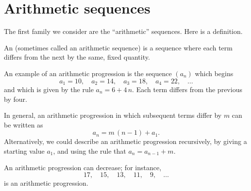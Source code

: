 \documentclass{ximera}
\begin{document}
\begin{question}
    \begin{multipleChoice}
    \end{multipleChoice}

\end{question}


\section{Arithmetic sequences}


The first family we consider are the ``arithmetic'' sequences.  Here
is a definition.



\begin{definition}
  An  (sometimes called an arithmetic
  sequence) is a sequence where each
  term differs from the next by the same, fixed quantity.
\end{definition}

\begin{example}
  An example of an arithmetic progression is the sequence $(a_n)$ which begins 
  $$
  a_1 = 10, \quad a_2 = 14, \quad a_3 = 18, \quad a_4 = 22, \quad\ldots
  $$
  and which is given by the rule $a_n = 6 + 4 \, n$.  Each term differs
  from the previous by four.
\end{example}

In general, an arithmetic progression in which subsequent terms differ
by $m$ can be written as
$$
a_n = m \, (n-1) + a_1.
$$
Alternatively, we could describe an arithmetic progression
recursively, by giving a starting value $a_1$, and using the rule that
$a_{n} = a_{n-1} + m$.


An arithmetic progression can decrease; for instance,
$$
17,\quad  15,\quad  13,\quad  11,\quad  9, \quad\ldots
$$
is an arithmetic progression.
\end{document}
